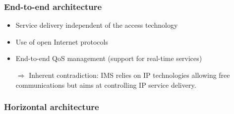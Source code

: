 \documentclass[pdf]{beamer}
\begin{document}
    \begin{frame}
        \frametitle{End-to-end architecture}
        \begin{itemize}
            \item Service delivery independent of the access technology
            \item Use of open Internet protocols
            \item End-to-end QoS management (support for real-time services)
            \pause
            \item[$\Rightarrow $] Inherent contradiction: IMS relies on IP technologies allowing free communications but aims at controlling IP service delivery.
        \end{itemize}
    \end{frame}

   
    \begin{frame}
        \frametitle{Horizontal architecture}
        \begin{overprint}
        \end{overprint}
    \end{frame}   
   
\end{document}
